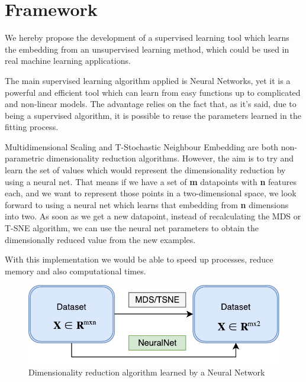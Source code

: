 \documentclass[a4paper,11pt,spanish]{report}
\begin{document}

\chapter{Framework}
\label{chap:frame}

We hereby propose the development of a supervised learning tool which learns the embedding from an unsupervised learning method, which could be used in real machine learning applications.

The main supervised learning algorithm applied is Neural Networks, yet it is a powerful and efficient tool which can learn from easy functions up to complicated and non-linear models. The advantage relies on the fact that, as it's said, due to being a supervised algorithm, it is possible to reuse the parameters learned in the fitting process.

Multidimensional Scaling and T-Stochastic Neighbour Embedding are both non-parametric dimensionality reduction algorithms. However, the aim is to try and learn the set of values which would represent the dimensionality reduction by using a neural net. That means if we have a set of \textbf{m} datapoints with \textbf{n} features each, and we want to represent those points in a two-dimensional space, we look forward to using a neural net which learns that embedding from \textbf{n} dimensions into two. As soon as we get a new datapoint, instead of recalculating the MDS or T-SNE algorithm, we can use the neural net parameters to obtain the dimensionally reduced value from the new examples.

With this implementation we would be able to speed up processes, reduce memory and also computational times.

\begin{figure}
\centering
\includegraphics[width=12cm]{figures/neuralnet.pdf}
\caption{\label{figurenet}Dimensionality reduction algorithm learned by a Neural Network}
\end{figure}
\end{document}
